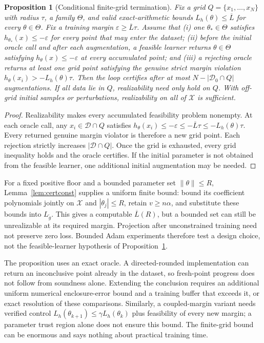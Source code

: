 \documentclass[12pt,onecolumn,journal]{IEEEtran}
\newtheorem{proposition}{Proposition}
\newcommand{\X}{\mathcal{X}}
\newcommand{\D}{\mathcal{D}}
\begin{document}
\begin{proposition}[Conditional finite-grid termination]
\label{prop:termination}
Fix a grid $Q=\{x_1,\ldots,x_N\}$ with radius $\tau$, a family $\Theta$, and valid exact-arithmetic bounds $L_h(\theta)\le\overline L$ for every $\theta\in\Theta$. Fix a training margin $\varepsilon\ge\overline L\tau$. Assume that (i) one $\theta_*\in\Theta$ satisfies $h_{\theta_*}(x)\le-\varepsilon$ for every point that may enter the dataset; (ii) before the initial oracle call and after each augmentation, a feasible learner returns $\theta\in\Theta$ satisfying $h_\theta(x)\le-\varepsilon$ at every accumulated point; and (iii) a rejecting oracle returns at least one grid point satisfying the genuine strict margin violation $h_\theta(x_i)>-L_h(\theta)\tau$. Then the loop certifies after at most $N-|\D_0\cap Q|$ augmentations. If all data lie in $Q$, realizability need only hold on $Q$. With off-grid initial samples or perturbations, realizability on all of $\X$ is sufficient.
\end{proposition}

\begin{proof}
Realizability makes every accumulated feasibility problem nonempty. At each oracle call, any $x_i\in\D\cap Q$ satisfies $h_\theta(x_i)\le-\varepsilon\le-\overline L\tau\le-L_h(\theta)\tau$. Every returned genuine margin violator is therefore a new grid point. Each rejection strictly increases $|\D\cap Q|$. Once the grid is exhausted, every grid inequality holds and the oracle certifies. If the initial parameter is not obtained from the feasible learner, one additional initial augmentation may be needed.
\end{proof}

For a fixed positive floor and a bounded parameter set $\|\theta\|\le R$, Lemma~\ref{lem:certconst} supplies a uniform finite bound: bound its coefficient polynomials jointly on $\X$ and $|\theta_j|\le R$, retain $v\ge n\alpha$, and substitute these bounds into $L_{\tilde g}$. This gives a computable $\overline L(R)$, but a bounded set can still be unrealizable at its required margin. Projection after unconstrained training need not preserve zero loss. Bounded Adam experiments therefore test a design choice, not the feasible-learner hypothesis of Proposition~\ref{prop:termination}.

The proposition uses an exact oracle. A directed-rounded implementation can return an inconclusive point already in the dataset, so fresh-point progress does not follow from soundness alone. Extending the conclusion requires an additional uniform numerical enclosure-error bound and a training buffer that exceeds it, or exact resolution of these comparisons. Similarly, a coupled-margin variant needs verified control $L_h(\theta_{k+1})\le\gamma L_h(\theta_k)$ plus feasibility of every new margin; a parameter trust region alone does not ensure this bound. The finite-grid bound can be enormous and says nothing about practical training time.
\end{document}

